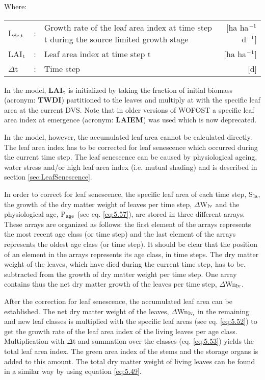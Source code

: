 Where:\\[5pt]
\begin{tabularx}{\textwidth}{llXr}
	L$_{{\rm Sc,t}}$ &:& Growth rate of the leaf area index at time step t
	during the source limited growth stage     &   [ha ha$^{{\rm -1}}$ d$^{{\rm -1}}$]\\
	LAI$_{{\rm t}}$ &:& Leaf area index at time step t     &
	[ha ha$^{{\rm -1}}$]\\
	$\Delta$t &:& Time step    &    [d]\\
\end{tabularx}

In the model, {\bf LAI$_{{\rm t}}$} is initialized by taking the fraction of initial biomass (acronym: {\bf TWDI}) partitioned to the leaves and multiply at with the specific leaf area at the current DVS. Note that in older versions of WOFOST a specific leaf area index at emergence (acronym: {\bf LAIEM}) was used which is now deprecated.

In the model, however, the accumulated leaf area cannot be calculated directly. The leaf area index has to be corrected for leaf senescence which occurred during the current time step. The leaf senescence can be caused by physiological ageing, water stress and/or high leaf area index (i.e. mutual shading) and is described in section \ref{sec:LeafSenescence}.

In order to correct for leaf senescence, the specific leaf area of each time step, S$_{{\rm la}}$, the growth of the dry matter weight of leaves per time step, $\Delta$W$_{{\rm lv}}$ and the physiological age, P$_{{\rm age}}$ (see eq. \ref{eq:5.57}), are stored in three different arrays. These arrays are organized as follows: the first element of the arrays represents the most recent age class (or time step) and the last element of the arrays represents the oldest age class (or time step). It should be clear that the position of an element in the arrays represents its age class, in time steps. The dry matter weight of the leaves, which have died during the current time step, has to be. subtracted from the growth of dry matter weight per time step. One array contains thus the net dry matter growth of the leaves per time step, $\Delta$Wn$_{{\rm lv}}$. 

After the correction for leaf senescence, the accumulated leaf area can be established. The net dry matter weight of the leaves, $\Delta$Wn$_{{\rm lv,}}$  in the remaining and new leaf classes is multiplied with the specific leaf areas (see eq. \ref{eq:5.52}) to get the growth rate of the leaf area index of the living leaves per age class. Multiplication with $\Delta$t and summation over the classes (eq. \ref{eq:5.53}) yields the total leaf area index. The green area index of the stems and the storage organs is added to this amount. The total dry matter weight of living leaves can be found in a similar way by using equation \ref{eq:5.49}. 

